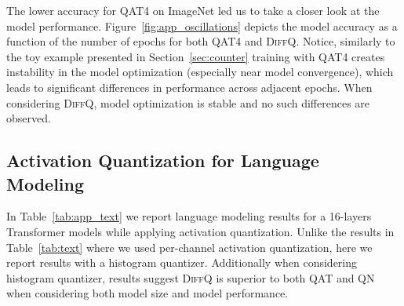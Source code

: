 \documentclass{article}
\newcommand{\diffq}{\textsc{DiffQ}\xspace}
\begin{document}
The lower accuracy for QAT4 on ImageNet led us to take a closer look at the model performance. Figure~\ref{fig:app_oscillations} depicts the model accuracy as a function of the number of epochs for both QAT4 and \diffq. Notice, similarly to the toy example presented in Section~\ref{sec:counter} training with QAT4 creates instability in the model optimization (especially near model convergence), which leads to significant differences in performance across adjacent epochs. When considering \diffq, model optimization is stable and no such differences are observed. 







\vspace{-0.2cm}
\subsection{Activation Quantization for Language Modeling}
\vspace{-0.1cm}
In Table~\ref{tab:app_text} we report language modeling results for a 16-layers Transformer models while applying activation quantization. Unlike the results in Table~\ref{tab:text} where we used per-channel activation quantization, here we report results with a histogram quantizer. Additionally when considering histogram quantizer, results suggest \diffq is superior to both QAT and QN when considering both model size and model performance.
\end{document}
